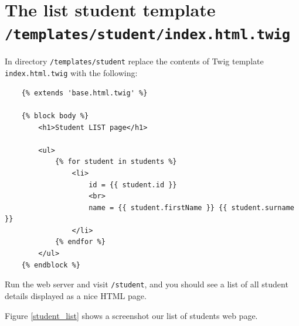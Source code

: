 \documentclass[a4paperpaper,openright]{book}
\newenvironment{Shaded}{}{}
\newcommand{\ExtensionTok}[1]{#1}
\newcommand{\NormalTok}[1]{#1}
\begin{document}
\begin{Shaded}
\end{Shaded}

\hypertarget{the-list-student-template-templatesstudentindex.html.twig}{%
\section{\texorpdfstring{The list student template
\texttt{/templates/student/index.html.twig}}{The list student template /templates/student/index.html.twig}}\label{the-list-student-template-templatesstudentindex.html.twig}}

In directory \texttt{/templates/student} replace the contents of Twig
template \texttt{index.html.twig} with the following:

\begin{verbatim}
    {% extends 'base.html.twig' %}

    {% block body %}
        <h1>Student LIST page</h1>

        <ul>
            {% for student in students %}
                <li>
                    id = {{ student.id }}
                    <br>
                    name = {{ student.firstName }} {{ student.surname }}
                </li>
            {% endfor %}
        </ul>
    {% endblock %}
\end{verbatim}

Run the web server and visit \texttt{/student}, and you should see a
list of all student details displayed as a nice HTML page.

Figure \ref{student_list} shows a screenshot our list of students web
page.
\end{document}
